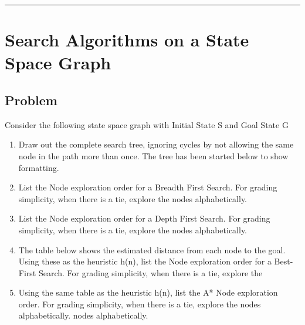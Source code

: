 \documentclass[11pt]{article}
\begin{document}
\begin{flushleft}
\begin{center}
\end{center}

\hspace{1cm}
\hrule
\section*{Search Algorithms on a State Space Graph}

\subsection*{Problem}
Consider the following state space graph with Initial State S and Goal State G

\begin{enumerate}
    \item Draw out the complete search tree, ignoring cycles by not allowing
        the same node in the path more than once. The tree has been started
        below to show formatting.
    \item List the Node exploration order for a Breadth First Search. For
        grading simplicity, when there is a tie, explore the nodes
        alphabetically.
    \item List the Node exploration order for a Depth First Search. For grading
        simplicity, when there is a tie, explore the nodes alphabetically.
    \item The table below shows the estimated distance from each node to the
        goal. Using these as the heuristic h(n), list the Node exploration
        order for a Best-First Search. For grading simplicity, when there is a
        tie, explore the
    \item Using the same table as the heuristic h(n), list the A* Node
        exploration order. For grading simplicity, when there is a tie, explore
        the nodes alphabetically. nodes alphabetically.
\end{enumerate}


\end{flushleft}
\end{document}
